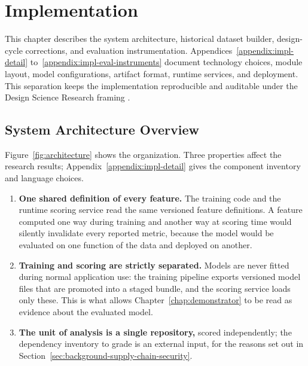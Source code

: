 \chapter{Implementation}
\label{chap:implementation}

This chapter describes the system architecture, historical dataset builder,
design-cycle corrections, and evaluation instrumentation. Appendices~\ref{appendix:impl-detail}
to~\ref{appendix:impl-eval-instruments} document technology choices, module
layout, model configurations, artifact format, runtime services, and deployment.
This separation keeps the implementation reproducible and auditable under the
Design Science Research framing \cite{hevner2004design,peffers2007design}.

\section{System Architecture Overview}
\label{sec:impl-architecture}

Figure~\ref{fig:architecture} shows the organization. Three properties affect the
research results; Appendix~\ref{appendix:impl-detail} gives the component
inventory and language choices.

\begin{enumerate}
  \item \textbf{One shared definition of every feature.} The training code and the runtime scoring service read the same versioned feature definitions. A feature computed one way during training and another way at scoring time would silently invalidate every reported metric, because the model would be evaluated on one function of the data and deployed on another.

  \item \textbf{Training and scoring are strictly separated.} Models are never fitted during normal application use: the training pipeline exports versioned model files that are promoted into a staged bundle, and the scoring service loads only these. This is what allows Chapter~\ref{chap:demonstrator} to be read as evidence about the evaluated model.

  \item \textbf{The unit of analysis is a single repository,} scored independently; the dependency inventory to grade is an external input, for the reasons set out in Section~\ref{sec:background-supply-chain-security}.
\end{enumerate}

